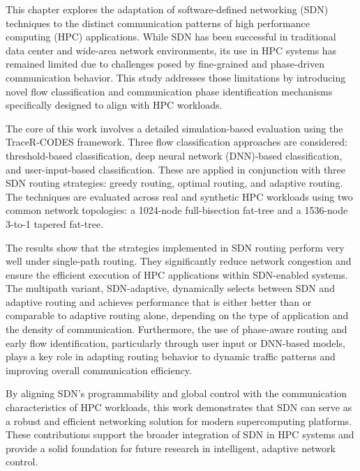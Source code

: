 This chapter explores the adaptation of software-defined networking (SDN) techniques to the distinct communication patterns of high performance computing (HPC) applications. While SDN has been successful in traditional data center and wide-area network environments, its use in HPC systems has remained limited due to challenges posed by fine-grained and phase-driven communication behavior. This study addresses those limitations by introducing novel flow classification and communication phase identification mechanisms specifically designed to align with HPC workloads.

The core of this work involves a detailed simulation-based evaluation using the TraceR-CODES framework. Three flow classification approaches are considered: threshold-based classification, deep neural network (DNN)-based classification, and user-input-based classification. These are applied in conjunction with three SDN routing strategies: greedy routing, optimal routing, and adaptive routing. The techniques are evaluated across real and synthetic HPC workloads using two common network topologies: a 1024-node full-bisection fat-tree and a 1536-node 3-to-1 tapered fat-tree.

The results show that the strategies implemented in SDN routing perform very well under single-path routing. They significantly reduce network congestion and ensure the efficient execution of HPC applications within SDN-enabled systems. The multipath variant, SDN-adaptive, dynamically selects between SDN and adaptive routing and achieves performance that is either better than or comparable to adaptive routing alone, depending on the type of application and the density of communication. Furthermore, the use of phase-aware routing and early flow identification, particularly through user input or DNN-based models, plays a key role in adapting routing behavior to dynamic traffic patterns and improving overall communication efficiency.

By aligning SDN’s programmability and global control with the communication characteristics of HPC workloads, this work demonstrates that SDN can serve as a robust and efficient networking solution for modern supercomputing platforms. These contributions support the broader integration of SDN in HPC systems and provide a solid foundation for future research in intelligent, adaptive network control.

